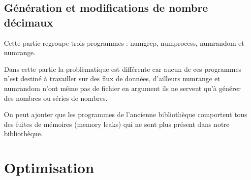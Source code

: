 \subsection{G\'en\'eration et modifications de nombre d\'ecimaux}

Cette partie regroupe trois programmes : numgrep, numprocess, numrandom et numrange.
\newline

Dans cette partie la probl\`ematique est différente car aucun de ces programmes n'est destin\'e \`a travailler sur des flux de donn\'ees, 
d'ailleurs numrange et numrandom n'ont m\^eme pas de fichier en argument ils ne servent qu'\`a g\'en\'erer des nombres ou s\'eries de nombres.


On peut ajouter que les programmes de l'ancienne biblioth\`eque comportent tous des fuites de m\'emoires (memory leaks) qui ne sont plus pr\'esent 
dans notre biblioth\`eque.

\section{Optimisation}